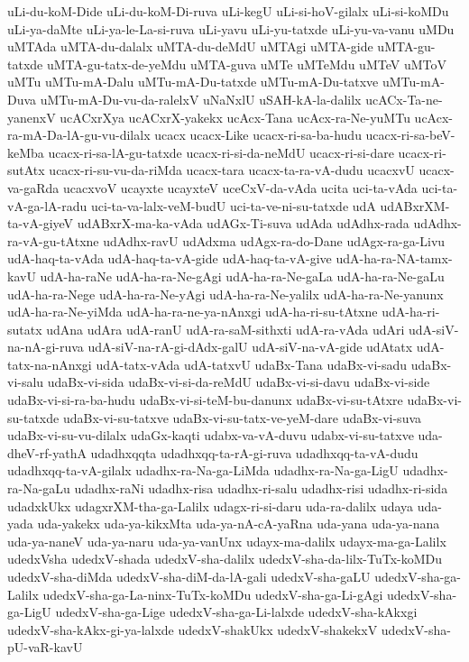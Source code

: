 {uLi-du-koM-Dide
uLi-du-koM-Di-ruva
uLi-kegU
uLi-si-hoV-gilalx
uLi-si-koMDu
uLi-ya-daMte
uLi-ya-le-La-si-ruva
uLi-yavu
uLi-yu-tatxde
uLi-yu-va-vanu
uMDu
uMTAda
uMTA-du-dalalx
uMTA-du-deMdU
uMTAgi
uMTA-gide
uMTA-gu-tatxde
uMTA-gu-tatx-de-yeMdu
uMTA-guva
uMTe
uMTeMdu
uMTeV
uMToV
uMTu
uMTu-mA-Dalu
uMTu-mA-Du-tatxde
uMTu-mA-Du-tatxve
uMTu-mA-Duva
uMTu-mA-Du-vu-da-ralelxV
uNaNxlU
uSAH-kA-la-dalilx
ucACx-Ta-ne-yanenxV
ucACxrXya
ucACxrX-yakekx
ucAcx-Tana
ucAcx-ra-Ne-yuMTu
ucAcx-ra-mA-Da-lA-gu-vu-dilalx
ucacx
ucacx-Like
ucacx-ri-sa-ba-hudu
ucacx-ri-sa-beV-keMba
ucacx-ri-sa-lA-gu-tatxde
ucacx-ri-si-da-neMdU
ucacx-ri-si-dare
ucacx-ri-sutAtx
ucacx-ri-su-vu-da-riMda
ucacx-tara
ucacx-ta-ra-vA-dudu
ucacxvU
ucacx-va-gaRda
ucacxvoV
ucayxte
ucayxteV
uceCxV-da-vAda
ucita
uci-ta-vAda
uci-ta-vA-ga-lA-radu
uci-ta-va-lalx-veM-budU
uci-ta-ve-ni-su-tatxde
udA
udABxrXM-ta-vA-giyeV
udABxrX-ma-ka-vAda
udAGx-Ti-suva
udAda
udAdhx-rada
udAdhx-ra-vA-gu-tAtxne
udAdhx-ravU
udAdxma
udAgx-ra-do-Dane
udAgx-ra-ga-Livu
udA-haq-ta-vAda
udA-haq-ta-vA-gide
udA-haq-ta-vA-give
udA-ha-ra-NA-tamx-kavU
udA-ha-raNe
udA-ha-ra-Ne-gAgi
udA-ha-ra-Ne-gaLa
udA-ha-ra-Ne-gaLu
udA-ha-ra-Nege
udA-ha-ra-Ne-yAgi
udA-ha-ra-Ne-yalilx
udA-ha-ra-Ne-yanunx
udA-ha-ra-Ne-yiMda
udA-ha-ra-ne-ya-nAnxgi
udA-ha-ri-su-tAtxne
udA-ha-ri-sutatx
udAna
udAra
udA-ranU
udA-ra-saM-sithxti
udA-ra-vAda
udAri
udA-siV-na-nA-gi-ruva
udA-siV-na-rA-gi-dAdx-galU
udA-siV-na-vA-gide
udAtatx
udA-tatx-na-nAnxgi
udA-tatx-vAda
udA-tatxvU
udaBx-Tana
udaBx-vi-sadu
udaBx-vi-salu
udaBx-vi-sida
udaBx-vi-si-da-reMdU
udaBx-vi-si-davu
udaBx-vi-side
udaBx-vi-si-ra-ba-hudu
udaBx-vi-si-teM-bu-danunx
udaBx-vi-su-tAtxre
udaBx-vi-su-tatxde
udaBx-vi-su-tatxve
udaBx-vi-su-tatx-ve-yeM-dare
udaBx-vi-suva
udaBx-vi-su-vu-dilalx
udaGx-kaqti
udabx-va-vA-duvu
udabx-vi-su-tatxve
uda-dheV-rf-yathA
udadhxqqta
udadhxqq-ta-rA-gi-ruva
udadhxqq-ta-vA-dudu
udadhxqq-ta-vA-gilalx
udadhx-ra-Na-ga-LiMda
udadhx-ra-Na-ga-LigU
udadhx-ra-Na-gaLu
udadhx-raNi
udadhx-risa
udadhx-ri-salu
udadhx-risi
udadhx-ri-sida
udadxkUkx
udagxrXM-tha-ga-Lalilx
udagx-ri-si-daru
uda-ra-dalilx
udaya
uda-yada
uda-yakekx
uda-ya-kikxMta
uda-ya-nA-cA-yaRna
uda-yana
uda-ya-nana
uda-ya-naneV
uda-ya-naru
uda-ya-vanUnx
udayx-ma-dalilx
udayx-ma-ga-Lalilx
udedxVsha
udedxV-shada
udedxV-sha-dalilx
udedxV-sha-da-lilx-TuTx-koMDu
udedxV-sha-diMda
udedxV-sha-diM-da-lA-gali
udedxV-sha-gaLU
udedxV-sha-ga-Lalilx
udedxV-sha-ga-La-ninx-TuTx-koMDu
udedxV-sha-ga-Li-gAgi
udedxV-sha-ga-LigU
udedxV-sha-ga-Lige
udedxV-sha-ga-Li-lalxde
udedxV-sha-kAkxgi
udedxV-sha-kAkx-gi-ya-lalxde
udedxV-shakUkx
udedxV-shakekxV
udedxV-sha-pU-vaR-kavU
}
